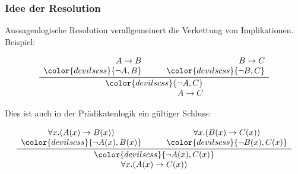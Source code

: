 \documentclass[aspectratio=1610,onlymath]{beamer}
\begin{document}
\begin{frame}\frametitle{Idee der Resolution}

Aussagenlogische Resolution verallgemeinert die Verkettung von Implikationen. Beispiel:\bigskip

\[
\frac{
\begin{array}{r}
A \to B\\
{\color{devilscss}\{\neg A, B\}}
\end{array}
\qquad
\begin{array}{r}
B \to C\\
{\color{devilscss}\{\neg B, C\}}
\end{array}
}{
\begin{array}{r}
{\color{devilscss}\{\neg A, C\}}\\
A \to C
\end{array}
}
\]

\pause Dies ist auch in der Prädikatenlogik ein gültiger Schluss:

\[
\frac{
\begin{array}{c}
\forall x.(A(x) \to B(x))\\
{\color{devilscss}\{\neg A(x), B(x)\}}
\end{array}
\qquad
\begin{array}{c}
\forall x.(B(x) \to C(x))\\
{\color{devilscss}\{\neg B(x), C(x)\}}
\end{array}
}{
\begin{array}{c}
{\color{devilscss}\{\neg A(x), C(x)\}}\\
\forall x.(A(x) \to C(x))
\end{array}
}
\]

\end{frame}
\end{document}
